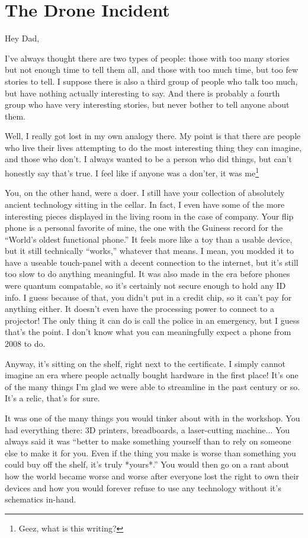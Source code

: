 \chapter{The Drone Incident}

\noindent Hey Dad,

I've always thought there are two types of people: those with too many stories but not enough time to tell them all, and those with too much time, but too few stories to tell.
I suppose there is also a third group of people who talk too much, but have nothing actually interesting to say.
And there is probably a fourth group who have very interesting stories, but never bother to tell anyone about them.

Well, I really got lost in my own analogy there.
My point is that there are people who live their lives attempting to do the most interesting thing they can imagine, and those who don't.
I always wanted to be a person who did things, but can't honestly say that's true.
I feel like if anyone was a don'ter, it was me\footnote{Geez, what is this writing?}

You, on the other hand, were a doer.
I still have your collection of absolutely ancient technology sitting in the cellar.
In fact, I even have some of the more interesting pieces displayed in the living room in the case of company.
Your flip phone is a personal favorite of mine, the one with the Guiness record for the ``World's oldest functional phone.''
It feels more like a toy than a usable device, but it still technically ``works,'' whatever that means.
I mean, you modded it to have a useable touch-panel with a decent connection to the internet, but it's still too slow to do anything meaningful.
It was also made in the era before phones were quantum compatable, so it's certainly not secure enough to hold any ID info.
I guess because of that, you didn't put in a credit chip, so it can't pay for anything either.
It doesn't even have the processing power to connect to a projector!
The only thing it can do is call the police in an emergency, but I guess that's the point.
I don't know what you can meaningfully expect a phone from 2008 to do.

Anyway, it's sitting on the shelf, right next to the certificate.
I simply cannot imagine an era where people actually bought hardware in the first place!
It's one of the many things I'm glad we were able to streamline in the past century or so.
It's a relic, that's for sure.

It was one of the many things you would tinker about with in the workshop.
You had everything there: 3D printers, breadboards, a laser-cutting machine...
You always said it was ``better to make something yourself than to rely on someone else to make it for you.
Even if the thing you make is worse than something you could buy off the shelf, it's truly *yours*.''
You would then go on a rant about how the world became worse and worse after everyone lost the right to own their devices and how you would forever refuse to use any technology without it's schematics in-hand.

